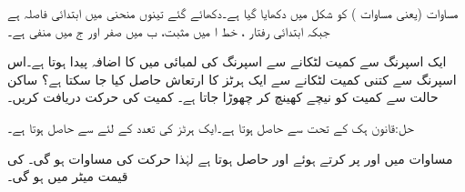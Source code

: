 مساوات  (یعنی مساوات ) کو شکل  میں دکھایا گیا ہے۔دکھائے گئے تینوں منحنی میں ابتدائی فاصلہ  ہے جبکہ ابتدائی رفتار ،  خط ا میں مثبت، ب میں صفر اور ج  میں منفی ہے۔

ایک اسپرنگ سے  کمیت لٹکانے سے اسپرنگ کی لمبائی میں  کا اضافہ پیدا ہوتا ہے۔اس اسپرنگ سے کتنی کمیت لٹکانے سے ایک ہرٹز  کا ارتعاش حاصل کیا جا سکتا ہے؟ ساکن حالت سے کمیت کو  نیچے کھینچ کر چھوڑا جاتا ہے۔ کمیت کی حرکت دریافت کریں۔

حل:قانون ہک کے تحت  سے  حاصل ہوتا ہے۔ایک ہرٹز کی تعدد کے لئے  سے  حاصل ہوتا ہے۔

مساوات  میں  اور  پر کرتے ہوئے  اور  حاصل ہوتا ہے لہٰذا حرکت کی مساوات  ہو گی۔ کی قیمت میٹر میں ہو گی۔

